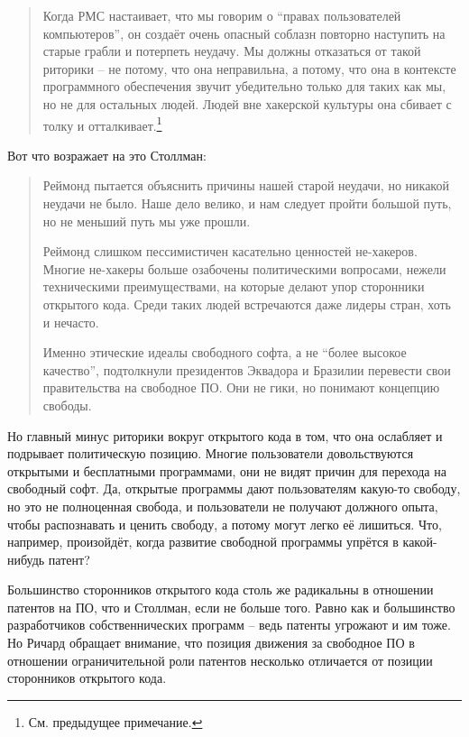 \begin{quote}
Когда РМС настаивает, что мы говорим о \enquote{правах пользователей компьютеров}, он создаёт очень опасный соблазн повторно наступить на старые грабли и потерпеть неудачу. Мы должны отказаться от такой риторики -- не потому, что она неправильна, а потому, что она в контексте программного обеспечения звучит убедительно только для таких как мы, но не для остальных людей. Людей вне хакерской культуры она сбивает с толку и отталкивает.\footnote{См. предыдущее примечание.}
\end{quote}

Вот что возражает на это Столлман:

\begin{quote}
Реймонд пытается объяснить причины нашей старой неудачи, но никакой неудачи не было. Наше дело велико, и нам следует пройти большой путь, но не меньший путь мы уже прошли.

Реймонд слишком пессимистичен касательно ценностей не-хакеров. Многие не-хакеры больше озабочены политическими вопросами, нежели техническими преимуществами, на которые делают упор сторонники открытого кода. Среди таких людей встречаются даже лидеры стран, хоть и нечасто.

Именно этические идеалы свободного софта, а не \enquote{более высокое качество}, подтолкнули президентов Эквадора и Бразилии перевести свои правительства на свободное ПО. Они не гики, но понимают концепцию свободы.
\end{quote}

Но главный минус риторики вокруг открытого кода в том, что она ослабляет и подрывает политическую позицию. Многие пользователи довольствуются открытыми и бесплатными программами, они не видят причин для перехода на свободный софт. Да, открытые программы дают пользователям какую-то свободу, но это не полноценная свобода, и пользователи не получают должного опыта, чтобы распознавать и ценить свободу, а потому могут легко её лишиться. Что, например, произойдёт, когда развитие свободной программы упрётся в какой-нибудь патент?

Большинство сторонников открытого кода столь же радикальны в отношении патентов на ПО, что и Столлман, если не больше того. Равно как и большинство разработчиков собственнических программ -- ведь патенты угрожают и им тоже. Но Ричард обращает внимание, что позиция движения за свободное ПО в отношении ограничительной роли патентов несколько отличается от позиции сторонников открытого кода.

